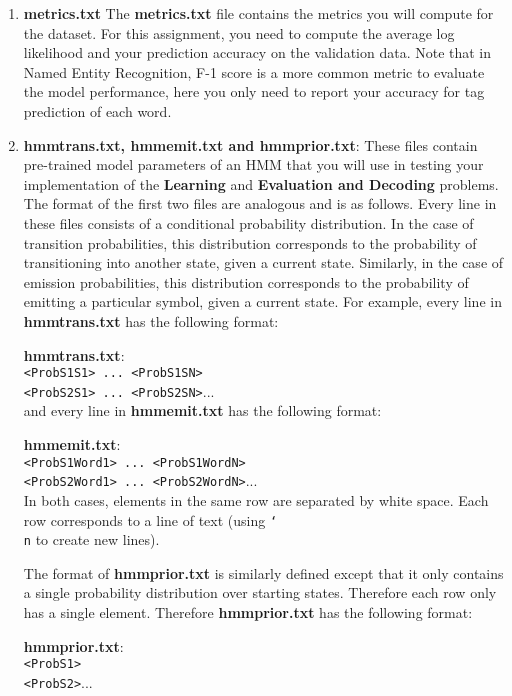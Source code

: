 \documentclass[11pt,addpoints,answers]{exam}
\begin{document}
\begin{enumerate}
\item \textbf{metrics.txt} The \textbf{metrics.txt} file contains the metrics you will compute for the dataset. For this assignment, you need to compute the average log likelihood and your prediction accuracy on the validation data. Note that in Named Entity Recognition, F-1 score is a more common metric to evaluate the model performance, here you only need to report your accuracy for tag prediction of each word. 

\item \textbf{hmmtrans.txt, hmmemit.txt and hmmprior.txt}: These files contain pre-trained model parameters of an HMM that you will use in testing your implementation of the \textbf{Learning} and \textbf{Evaluation and Decoding} problems. The format of the first two files are analogous and is as follows. Every line in these files consists of a conditional probability distribution. In the case of transition probabilities, this distribution corresponds to the probability of transitioning into another state, given a current state. Similarly, in the case of emission probabilities, this distribution corresponds to the probability of emitting a particular symbol, given a current state. For example, every line in \textbf{hmmtrans.txt} has the following format:
    
    \textbf{hmmtrans.txt}:\\
    \texttt{<ProbS1S1> ... <ProbS1SN>}\\
     \texttt{<ProbS2S1> ... <ProbS2SN>}...\\   
    
and every line in \textbf{hmmemit.txt} has the following format:
    
    \textbf{hmmemit.txt}:\\
    \texttt{<ProbS1Word1> ... <ProbS1WordN>}\\
     \texttt{<ProbS2Word1> ... <ProbS2WordN>}...\\
    
In both cases, elements in the same row are separated by white space. Each row corresponds to a line of text (using \texttt{\char`\\ n} to create new lines).
    
    
The format of \textbf{hmmprior.txt} is similarly defined except that it only contains a single probability distribution over starting states. Therefore each row only has a single element. Therefore \textbf{hmmprior.txt} has the following format:
    
    \textbf{hmmprior.txt}:\\
    \texttt{<ProbS1>}\\
     \texttt{<ProbS2>}...\\

\end{enumerate}
\end{document}
